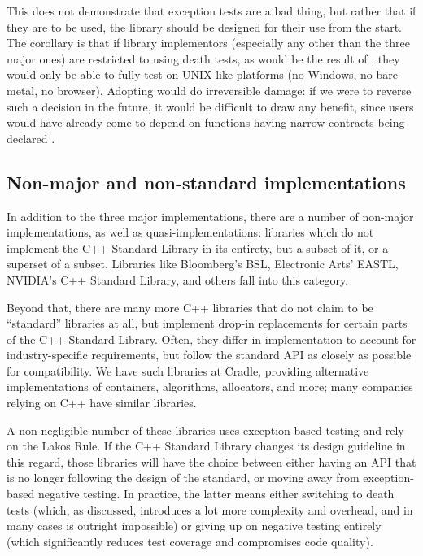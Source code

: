 This does not demonstrate that exception tests are a bad thing, but rather that if they are to be used, the library should be designed for their use from the start. The corollary is that if library implementors (especially any other than the three major ones) are restricted to using death tests, as would be the result of \cite{P1656R2}, they would only be able to fully test on UNIX-like platforms (no Windows, no bare metal, no browser). Adopting \cite{P1656R2} would do irreversible damage: if we were to reverse such a decision in the future, it would be difficult to draw any benefit, since users would have already come to depend on functions having narrow contracts being declared .

\subsection{Non-major and non-standard implementations}

In addition to the three major implementations, there are a number of non-major implementations, as well as quasi-implementations: libraries which do not implement the C++ Standard Library in its entirety, but a subset of it, or a superset of a subset. Libraries like Bloomberg's BSL, Electronic Arts' EASTL, NVIDIA's C++ Standard Library, and others fall into this category.

Beyond that, there are many more C++ libraries that do not claim to be ``standard'' libraries at all, but implement drop-in replacements for certain parts of the C++ Standard Library. Often, they differ in implementation to account for industry-specific requirements, but follow the standard API as closely as possible for compatibility. We have such libraries at Cradle, providing alternative implementations of containers, algorithms, allocators, and more; many companies relying on C++ have similar libraries.

A non-negligible number of these libraries uses exception-based testing and rely on the Lakos Rule. If the C++ Standard Library changes its design guideline in this regard, those libraries will have the choice between either having an API that is no longer following the design of the standard, or moving away from exception-based negative testing. In practice, the latter means either switching to death tests (which, as discussed, introduces a lot more complexity and overhead, and in many cases is outright impossible) or giving up on negative testing entirely (which significantly reduces test coverage and compromises code quality).

